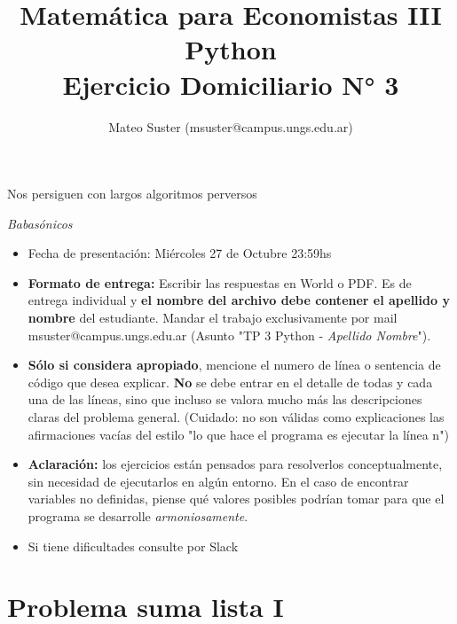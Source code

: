 \documentclass{article}
\title{Matemática para Economistas III \\ Python \\ Ejercicio Domiciliario N° 3}
\author{Mateo Suster (msuster@campus.ungs.edu.ar)}
\begin{document}
\maketitle
\setlength{\epigraphwidth}{0.55\textwidth}
\epigraph{Nos persiguen con largos algoritmos perversos}{\textit{Babasónicos}}

\begin{itemize}
	\item Fecha de presentación: Miércoles 27 de Octubre 23:59hs
    \item \textbf{Formato de entrega:} Escribir las respuestas en World o PDF. Es de entrega individual y \textbf{el nombre del archivo debe contener el apellido y nombre} del estudiante. Mandar el trabajo exclusivamente por mail msuster@campus.ungs.edu.ar (Asunto "TP 3 Python - \emph{Apellido Nombre}"). 
    \item \textbf{Sólo si considera apropiado}, mencione el numero de línea o sentencia de código que desea explicar. \textbf{No} se debe entrar en el detalle de todas y cada una de las líneas, sino que incluso se valora mucho más las descripciones claras del problema general. (Cuidado: no son válidas como explicaciones las afirmaciones vacías del estilo "lo que hace el programa es ejecutar la línea n")
    \item \textbf{Aclaración:} los ejercicios están pensados para resolverlos conceptualmente, sin necesidad de ejecutarlos en algún entorno. En el caso de encontrar variables no definidas, piense qué valores posibles podrían tomar para que el programa se desarrolle \emph{armoniosamente}.
    \item Si tiene dificultades consulte por Slack
\end{itemize}

%    
%
%    
%        

\clearpage
\section{Problema suma lista I}
\end{document}
